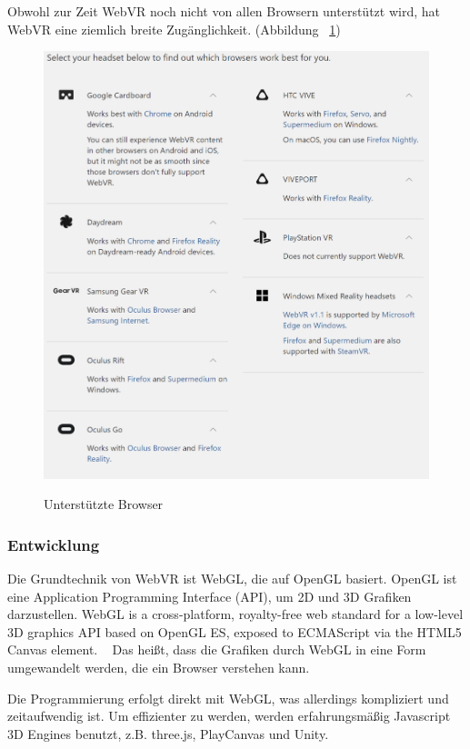  Obwohl zur Zeit WebVR noch nicht von allen Browsern unterstützt wird, hat WebVR eine ziemlich breite Zugänglichkeit. (Abbildung ~\ref{fig:supportedBrowsers})
 
\begin{figure}[ht]
\vspace*{1em}
\centering
\caption{Unterstützte Browser}
\includegraphics[width=\textwidth]{images/supportedBrowsers.png}
\label{fig:supportedBrowsers} 
\end{figure}
 
  \subsubsection{Entwicklung}
 Die Grundtechnik von WebVR ist WebGL, die auf OpenGL basiert. OpenGL ist eine Application Programming Interface (API), um 2D und 3D Grafiken darzustellen. \glqq WebGL is a cross-platform, royalty-free web standard for a low-level 3D graphics API based on OpenGL ES, exposed to ECMAScript via the HTML5 Canvas element. \grqq\ \citep{23} Das heißt, dass die Grafiken durch WebGL in eine Form umgewandelt werden, die ein Browser verstehen kann. 
 
 Die Programmierung erfolgt direkt mit WebGL, was allerdings kompliziert und zeitaufwendig ist. Um effizienter zu werden, werden erfahrungsmäßig Javascript 3D Engines benutzt, z.B. three.js, PlayCanvas und Unity.
 
